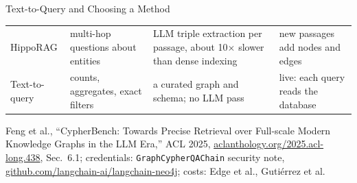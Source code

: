 \begin{frame}{Text-to-Query and Choosing a Method}
{\begin{tabular}{>{\raggedright\arraybackslash}p{1.8cm} >{\raggedright\arraybackslash}p{2.8cm} >{\raggedright\arraybackslash}p{4.4cm} >{\raggedright\arraybackslash}p{2.9cm}}
    \addlinespace[0.15em]
    HippoRAG & multi-hop questions about entities & LLM triple extraction per passage, about 10$\times$ slower than dense indexing & new passages add nodes and edges \\
    \addlinespace[0.15em]
    Text-to-query & counts, aggregates, exact filters & a curated graph and schema; no LLM pass & live: each query reads the database \\
    \bottomrule
  \end{tabular}\par}
  \vspace{0.2em}
  {\scriptsize Feng et al., ``CypherBench: Towards Precise Retrieval over Full-scale Modern Knowledge Graphs in the LLM Era,'' ACL 2025, \href{https://aclanthology.org/2025.acl-long.438/}{aclanthology.org/2025.acl-long.438}, Sec.~6.1; credentials: \texttt{GraphCypherQAChain} security note, \href{https://github.com/langchain-ai/langchain-neo4j}{github.com/langchain-ai/langchain-neo4j}; costs: Edge et al., Guti\'errez et al.\par}
\end{frame}
